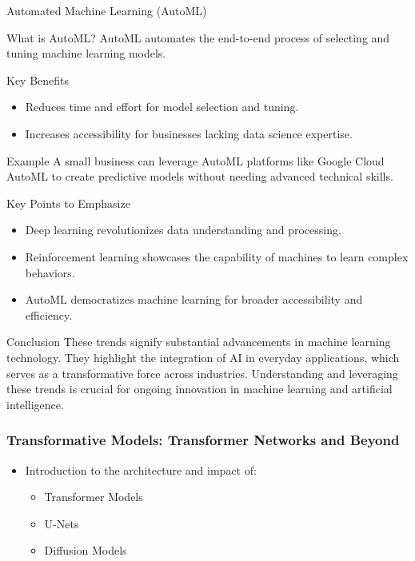 \documentclass[aspectratio=169]{beamer}
\begin{document}
\begin{frame}[fragile]{Automated Machine Learning (AutoML)}
  \begin{block}{What is AutoML?}
    AutoML automates the end-to-end process of selecting and tuning machine learning models.
  \end{block}

  \begin{block}{Key Benefits}
    \begin{itemize}
      \item Reduces time and effort for model selection and tuning.
      \item Increases accessibility for businesses lacking data science expertise.
    \end{itemize}
  \end{block}

  \begin{exampleblock}{Example}
    A small business can leverage AutoML platforms like Google Cloud AutoML to create predictive models without needing advanced technical skills.
  \end{exampleblock}
\end{frame}

\begin{frame}[fragile]{Key Points to Emphasize}
  \begin{itemize}
    \item Deep learning revolutionizes data understanding and processing.
    \item Reinforcement learning showcases the capability of machines to learn complex behaviors.
    \item AutoML democratizes machine learning for broader accessibility and efficiency.
  \end{itemize}
\end{frame}

\begin{frame}[fragile]{Conclusion}
  These trends signify substantial advancements in machine learning technology. They highlight the integration of AI in everyday applications, which serves as a transformative force across industries. Understanding and leveraging these trends is crucial for ongoing innovation in machine learning and artificial intelligence.
\end{frame}

\begin{frame}[fragile]
    \frametitle{Transformative Models: Transformer Networks and Beyond}
    \begin{itemize}
        \item Introduction to the architecture and impact of:
        \begin{itemize}
            \item Transformer Models
            \item U-Nets
            \item Diffusion Models
        \end{itemize}
    \end{itemize}
\end{frame}
\end{document}
